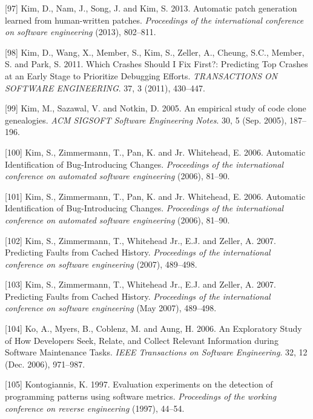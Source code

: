 \documentclass[12pt]{report}
\begin{document}
\hypertarget{ref-Kim2013}{}
{[}97{]} Kim, D., Nam, J., Song, J. and Kim, S. 2013. Automatic patch
generation learned from human-written patches. \emph{Proceedings of the
international conference on software engineering} (2013), 802--811.

\hypertarget{ref-Kim2011c}{}
{[}98{]} Kim, D., Wang, X., Member, S., Kim, S., Zeller, A., Cheung,
S.C., Member, S. and Park, S. 2011. Which Crashes Should I Fix First?:
Predicting Top Crashes at an Early Stage to Prioritize Debugging
Efforts. \emph{TRANSACTIONS ON SOFTWARE ENGINEERING}. 37, 3 (2011),
430--447.

\hypertarget{ref-Kim2005}{}
{[}99{]} Kim, M., Sazawal, V. and Notkin, D. 2005. An empirical study of
code clone genealogies. \emph{ACM SIGSOFT Software Engineering Notes}.
30, 5 (Sep. 2005), 187--196.

\hypertarget{ref-Kim2006}{}
{[}100{]} Kim, S., Zimmermann, T., Pan, K. and Jr. Whitehead, E. 2006.
Automatic Identification of Bug-Introducing Changes. \emph{Proceedings
of the international conference on automated software engineering}
(2006), 81--90.

\hypertarget{ref-Kim2006c}{}
{[}101{]} Kim, S., Zimmermann, T., Pan, K. and Jr. Whitehead, E. 2006.
Automatic Identification of Bug-Introducing Changes. \emph{Proceedings
of the international conference on automated software engineering}
(2006), 81--90.

\hypertarget{ref-Kim2007a}{}
{[}102{]} Kim, S., Zimmermann, T., Whitehead Jr., E.J. and Zeller, A.
2007. Predicting Faults from Cached History. \emph{Proceedings of the
international conference on software engineering} (2007), 489--498.

\hypertarget{ref-Kim2007}{}
{[}103{]} Kim, S., Zimmermann, T., Whitehead Jr., E.J. and Zeller, A.
2007. Predicting Faults from Cached History. \emph{Proceedings of the
international conference on software engineering} (May 2007), 489--498.

\hypertarget{ref-Ko2006d}{}
{[}104{]} Ko, A., Myers, B., Coblenz, M. and Aung, H. 2006. An
Exploratory Study of How Developers Seek, Relate, and Collect Relevant
Information during Software Maintenance Tasks. \emph{IEEE Transactions
on Software Engineering}. 32, 12 (Dec. 2006), 971--987.

\hypertarget{ref-Kontogiannis}{}
{[}105{]} Kontogiannis, K. 1997. Evaluation experiments on the detection
of programming patterns using software metrics. \emph{Proceedings of the
working conference on reverse engineering} (1997), 44--54.
\end{document}
